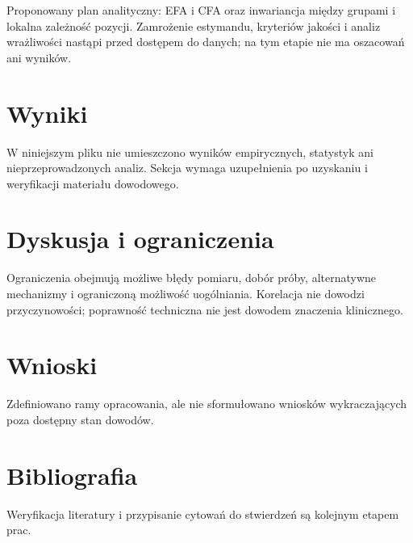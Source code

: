 \documentclass[11pt,a4paper]{article}
\begin{document}
Proponowany plan analityczny: EFA i CFA oraz inwariancja między grupami i lokalna zależność pozycji. Zamrożenie estymandu, kryteriów jakości i analiz wrażliwości nastąpi przed dostępem do danych; na tym etapie nie ma oszacowań ani wyników.

\section{Wyniki}

W niniejszym pliku nie umieszczono wyników empirycznych, statystyk ani nieprzeprowadzonych analiz. Sekcja wymaga uzupełnienia po uzyskaniu i weryfikacji materiału dowodowego.

\section{Dyskusja i ograniczenia}

Ograniczenia obejmują możliwe błędy pomiaru, dobór próby, alternatywne mechanizmy i ograniczoną możliwość uogólniania. Korelacja nie dowodzi przyczynowości; poprawność techniczna nie jest dowodem znaczenia klinicznego.

\section{Wnioski}

Zdefiniowano ramy opracowania, ale nie sformułowano wniosków wykraczających poza dostępny stan dowodów.

\section*{Bibliografia}

Weryfikacja literatury i przypisanie cytowań do stwierdzeń są kolejnym etapem prac.
\end{document}
